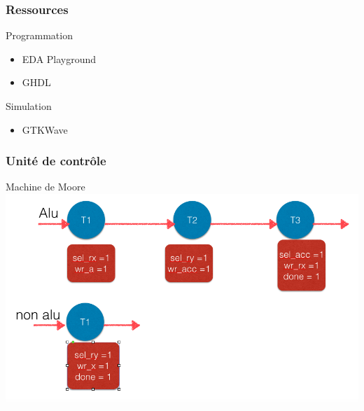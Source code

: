 \documentclass{beamer}
\begin{document}
\begin{frame}
\frametitle{Ressources} %
\begin{block}{Programmation}
	\begin{itemize}
		\item EDA Playground
		\item GHDL
	\end{itemize}
\end{block}
\begin{block}{Simulation}
	\begin{itemize}
		\item GTKWave
	\end{itemize}
\end{block}
\end{frame}



\begin{frame}
\frametitle{Unité de contrôle}
Machine de Moore
\includegraphics[scale=0.35]{fsm}
\end{frame}
\end{document}
